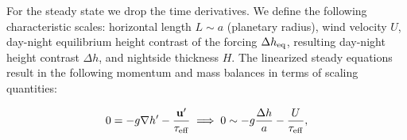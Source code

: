 \documentclass[trackchanges,twocolumn]{aastex7}
\begin{document}

For the steady state we drop the time derivatives. We define the following characteristic scales: horizontal length $L \sim a$ (planetary radius), wind velocity $U$, day-night equilibrium height contrast of the forcing $\Delta h_{\rm eq}$, resulting day-night height contrast $\Delta h$, and nightside thickness $H$. The linearized steady equations result in the following momentum and mass balances in terms of scaling quantities:

\begin{equation}
    0 = -g \nabla h' - \frac{\mathbf{u}'}{\tau_{\rm eff}} \implies 0 \sim -g \frac{\Delta h}{a} - \frac{U}{\tau_{\rm eff}},
    \label{eq:scale1}
\end{equation}
\end{document}
